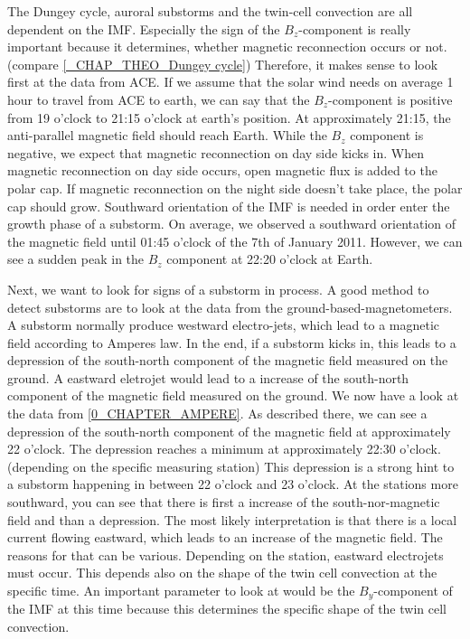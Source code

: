 \documentclass[10pt,a4paper]{article}
\begin{document}
The Dungey cycle, auroral substorms and the twin-cell convection are all dependent on the IMF. Especially the sign of the $B_z$-component is really important because it 
determines, whether magnetic reconnection occurs or not. (compare \ref{_CHAP_THEO_Dungey cycle}) Therefore, it makes sense to look first at the data from ACE. 
If we assume that the solar wind needs on average 1 hour to travel from ACE to earth, we can say that the $B_z$-component is positive from 19 o'clock to 21:15 o'clock 
at earth's position. At approximately 21:15, the anti-parallel magnetic field should reach Earth. While the $B_z$ component is negative, we expect that magnetic 
reconnection on day side kicks in. When magnetic reconnection on day side occurs, open magnetic flux is added to the polar cap. If magnetic reconnection on the night side doesn't take place, the polar cap should grow. Southward orientation of the IMF is needed in order enter the growth phase of a substorm. On average, we observed a 
southward orientation of the magnetic field until 01:45 o'clock of the 7th of January 2011. However, we can see a sudden peak in the $B_z$ component at 22:20 o'clock at 
Earth. 

Next, we want to look for signs of a substorm in process. A good method to detect substorms are to look at the data from the ground-based-magnetometers. A substorm 
normally produce westward electro-jets, which lead to a magnetic field according to Amperes law. In the end, if a substorm kicks in, this leads to a depression of the south-north component of the magnetic field measured on the ground. A eastward eletrojet would lead to a increase of the south-north component of the magnetic field measured on the ground. We now have a look at the data from \ref{0_CHAPTER_AMPERE}. As described there, we can see a depression of the south-north component of the magnetic field at approximately 22 o'clock. The depression reaches a minimum at approximately 22:30 o'clock. (depending on the specific measuring station) This depression is a strong hint to a substorm happening in between 22 o'clock and 23 o'clock. 
At the stations more southward, you can see that there is first a increase of the south-nor-magnetic field and than a depression. The most likely interpretation is that there is a local current flowing eastward, which leads to an increase of the magnetic field. The reasons for that can be various. Depending on the station, eastward electrojets must occur. This depends also on the shape of the twin cell convection at the specific time. An important parameter to look at would be the $B_y$-component of the IMF at this time because this determines the specific shape of the twin cell convection.
\end{document}
